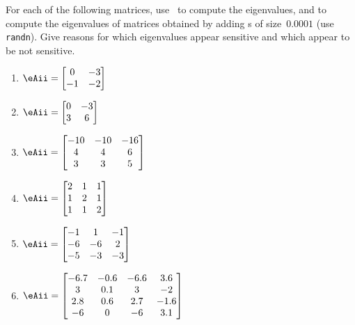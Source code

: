 \begin{exercise}  
For each of the following matrices, use \script\ to compute the eigenvalues, and to compute the eigenvalues of matrices obtained by adding s of size~\(0.0001\) (use \verb|randn|).
Give reasons for which eigenvalues appear sensitive and which appear to be not sensitive.
\begin{enumerate}
\item \(\eAii=\begin{bmatrix} 0&-3\\-1&-2 \end{bmatrix}\)

\item \(\eAii=\begin{bmatrix} 0&-3\\3&6 \end{bmatrix}\)

\item \(\eAii=\begin{bmatrix} -10 & -10 & -16
\\4 & 4 & 6
\\3 & 3 & 5 \end{bmatrix}\)

\item \(\eAii=\begin{bmatrix} 2&1&1
\\1&2&1
\\1&1&2 \end{bmatrix}\)

\item \(\eAii=\begin{bmatrix} -1 & 1 & -1
\\-6 & -6 & 2
\\-5 & -3 & -3 \end{bmatrix}\)

\item \(\eAii=\begin{bmatrix} -6.7 & -0.6 & -6.6 & 3.6
\\3 & 0.1 & 3 & -2
\\2.8 & 0.6 & 2.7 & -1.6
\\-6 & 0 & -6 & 3.1 \end{bmatrix}\)
\setbox\ajrqrbox\hbox{\qrcode{%
[-6.7 -0.6 -6.6 3.6
3 0.1 3 -2
2.8 0.6 2.7 -1.6
-6 0 -6 3.1]
}}\marginajrbox%


\end{enumerate}
\end{exercise}
